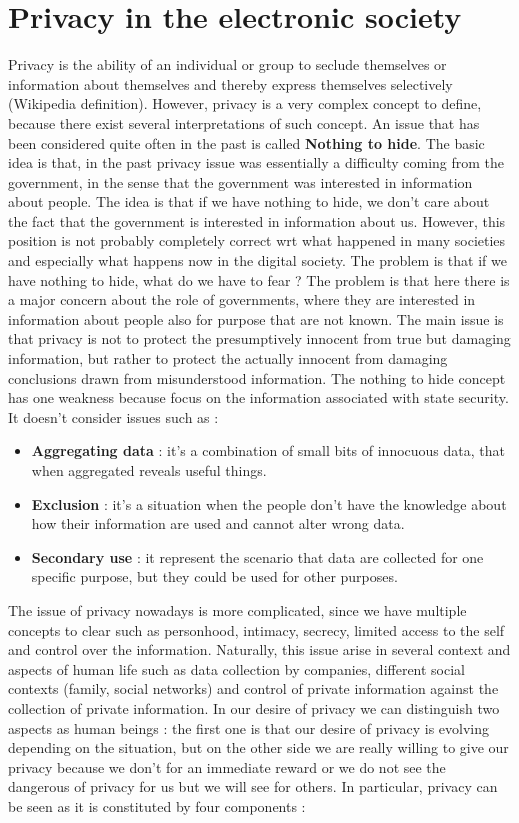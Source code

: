 \section{Privacy in the electronic society}
Privacy is the ability of an individual or group to seclude themselves or information about themselves and thereby express themselves selectively (Wikipedia definition). However, privacy is a very complex concept to define, because there exist several interpretations of such concept. An issue that has been considered quite often in the past is called \textbf{Nothing to hide}. The basic idea is that, in the past privacy issue was essentially a difficulty coming from the government, in the sense that the government was interested in information about people. The idea is that if we have nothing to hide, we don't care about the fact that the government is interested in information about us. However, this position is not probably completely correct wrt what happened in many societies and especially what happens now in the digital society. The problem is that if we have nothing to hide, what do we have to fear ? The problem is that here there is a major concern about the role of governments, where they are interested in information about people also for purpose that are not known. The main issue is that privacy is not to protect the presumptively innocent from true but damaging information, but rather to protect the actually innocent from damaging conclusions drawn from misunderstood information. The nothing to hide concept has one weakness because focus on the information associated with state security. It doesn't consider issues such as :
\begin{itemize}
\item \textbf{Aggregating data} : it's a combination of small bits of innocuous data, that when aggregated reveals useful things.
\item \textbf{Exclusion} : it's a situation when the people don't have the knowledge about how their information are used and cannot alter wrong data.
\item \textbf{Secondary use} : it represent the scenario that data are collected for one specific purpose, but they could be used for other purposes.
\end{itemize}
The issue of privacy nowadays is more complicated, since we have multiple concepts to clear such as personhood, intimacy, secrecy, limited access to the self and control over the information. Naturally, this issue arise in several context and aspects of human life such as data collection by companies, different social contexts (family, social networks) and control of private information against the collection of private information. In our desire of privacy we can distinguish two aspects as human beings : the first one is that our desire of privacy is evolving depending on the situation, but on the other side we are really willing to give our privacy because we don't for an immediate reward or we do not see the dangerous of privacy for us but we will see for others. In particular, privacy can be seen as it is constituted by four components :
